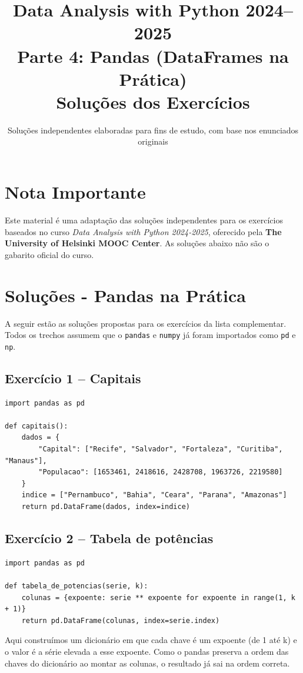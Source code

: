 \documentclass[11pt,a4paper]{article}
\title{\textbf{Data Analysis with Python 2024--2025}\\Parte 4: Pandas (DataFrames na Prática)\\\large Soluções dos Exercícios}
\author{Soluções independentes elaboradas para fins de estudo, com base nos enunciados originais}
\date{}
\begin{document}
\maketitle

\section*{Nota Importante}
Este material é uma adaptação das soluções independentes para os exercícios baseados no curso \textit{Data Analysis with Python 2024-2025}, oferecido pela \textbf{The University of Helsinki MOOC Center}. As soluções abaixo não são o gabarito oficial do curso.

\tableofcontents
\newpage

\section{Soluções - Pandas na Prática}

A seguir estão as soluções propostas para os exercícios da lista complementar. Todos os trechos assumem que o \texttt{pandas} e \texttt{numpy} já foram importados como \texttt{pd} e \texttt{np}.

\subsection*{Exercício 1 -- Capitais}
\begin{solucao}
\begin{lstlisting}
import pandas as pd

def capitais():
    dados = {
        "Capital": ["Recife", "Salvador", "Fortaleza", "Curitiba", "Manaus"],
        "Populacao": [1653461, 2418616, 2428708, 1963726, 2219580]
    }
    indice = ["Pernambuco", "Bahia", "Ceara", "Parana", "Amazonas"]
    return pd.DataFrame(dados, index=indice)
\end{lstlisting}
\end{solucao}

\subsection*{Exercício 2 -- Tabela de potências}
\begin{solucao}
\begin{lstlisting}
import pandas as pd

def tabela_de_potencias(serie, k):
    colunas = {expoente: serie ** expoente for expoente in range(1, k + 1)}
    return pd.DataFrame(colunas, index=serie.index)
\end{lstlisting}
Aqui construímos um dicionário em que cada chave é um expoente (de 1 até k) e o valor é a série elevada a esse expoente. Como o pandas preserva a ordem das chaves do dicionário ao montar as colunas, o resultado já sai na ordem correta.
\end{solucao}
\end{document}
